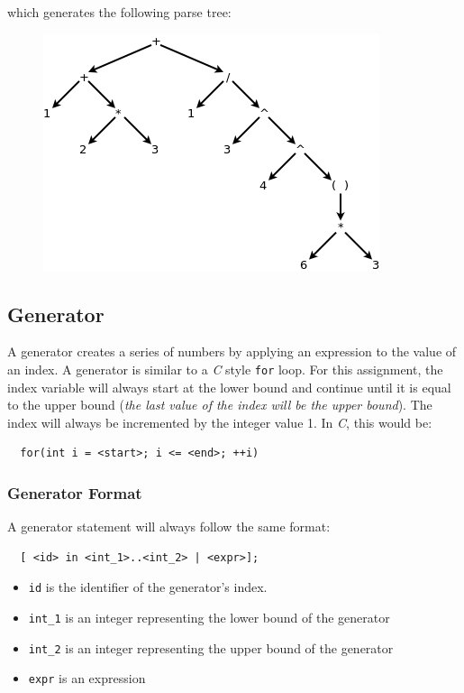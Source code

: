 \documentclass{article}
\newcommand{\code}[1]{\texttt{\textmd{#1}}}
\begin{document}
which generates the following parse tree:
\begin{figure}[H]
  \centering
  \includegraphics{static/assoc-example.png}
\end{figure}

\subsection{Generator}
A generator creates a series of numbers by applying an expression to the value of an index. A
generator is similar to a \textit{C} style \code{for} loop. For this assignment, the index variable
will always start at the lower bound and continue until it is equal to the upper bound (\textit{the
last value of the index will be the upper bound}). The index will always be incremented by the
integer value 1. In \textit{C}, this would be:
\begin{lstlisting}
  for(int i = <start>; i <= <end>; ++i)
\end{lstlisting}

\subsubsection{Generator Format}
A generator statement will always follow the same format:
\begin{lstlisting}
  [ <id> in <int_1>..<int_2> | <expr>];
\end{lstlisting}

\begin{itemize}
  \item \code{id} is the identifier of the generator's index.
  \item \code{int\_1} is an integer representing the lower bound of the generator
  \item \code{int\_2} is an integer representing the upper bound of the generator
  \item \code{expr} is an expression
\end{itemize}
\end{document}
